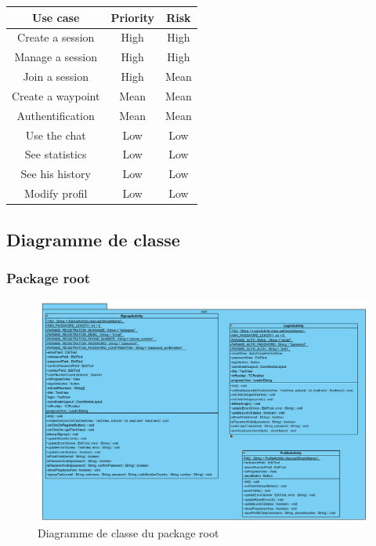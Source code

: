\documentclass[titlepage, 12pt]{report}
\begin{document}
\begin{center}
	\begin{tabular}{|c|c|c|}
		\hline
		Use case & Priority & Risk \\ \hline
		Create a session & High & High \\ \hline
		Manage a session & High & High \\ \hline
		Join a session & High & Mean \\ \hline
		Create a waypoint & Mean & Mean \\ \hline
		Authentification & Mean & Mean \\ \hline
		Use the chat & Low & Low \\ \hline
		See statistics & Low & Low \\ \hline
		See his history & Low & Low \\ \hline
		Modify profil & Low & Low \\
		\hline \hline
	\end{tabular}
\end{center}

\subsection{Diagramme de classe}

\subsubsection{Package root}

\begin{figure}[!h]
	\caption{Diagramme de classe du package root}
	\label{class_diagram_root}
	\centering
	\includegraphics[scale=0.4]{Images/diagram/package_root_diagram_class.png}
\end{figure}
\end{document}
